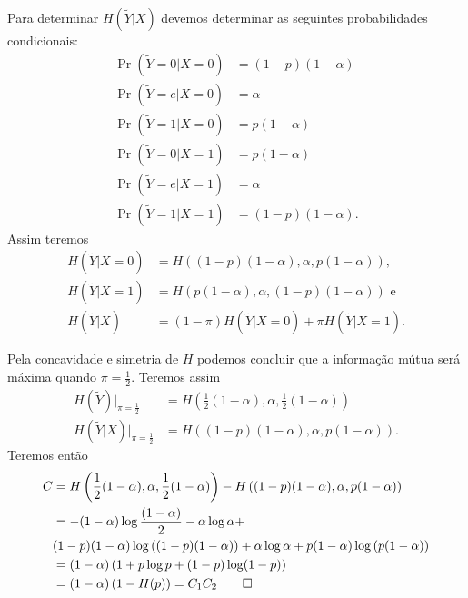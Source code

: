 \begin{questions}
\begin{solution}
Para determinar $H(\tilde{Y}|X)$ devemos determinar as seguintes probabilidades condicionais:
\begin{align}
\Pr(\tilde{Y} = 0 |X = 0) &= (1-p)(1-\alpha) \nonumber \\
\Pr(\tilde{Y} = e |X = 0) &= \alpha \nonumber \\
\Pr(\tilde{Y} = 1 |X = 0) &= p (1-\alpha) \nonumber \\
\Pr(\tilde{Y} = 0 |X = 1) &= p(1-\alpha) \nonumber \\
\Pr(\tilde{Y} = e |X = 1) &= \alpha \nonumber \\
\Pr(\tilde{Y} = 1 |X = 1) &= (1-p) (1-\alpha) .
\end{align}
Assim teremos
\begin{align}
H(\tilde{Y} |X = 0) &= H\left( (1-p)(1-\alpha), \alpha, p (1-\alpha) \right) , \nonumber \\
H(\tilde{Y} |X = 1) &= H\left( p(1-\alpha), \alpha, (1-p) (1-\alpha) \right) \text{ e} \nonumber \\
H(\tilde{Y} |X ) &= (1-\pi) H(\tilde{Y} |X = 0) + \pi H(\tilde{Y} |X = 1) .
\end{align}

Pela concavidade e simetria de $H$ podemos concluir que a informação mútua será máxima
quando $\pi = \frac{1}{2}$. Teremos assim
\begin{align}
H(\tilde{Y})\bigg\rvert_{\pi = \frac{1}{2}} &= H\left( \frac{1}{2} (1-\alpha), \alpha, \frac{1}{2} (1-\alpha) \right) \nonumber \\
H(\tilde{Y} |X )\bigg\rvert_{\pi = \frac{1}{2}} &= H\left( (1-p)(1-\alpha), \alpha, p(1-\alpha) \right) .
\end{align}
Teremos então
\begin{align}
C &= H\left( \frac{1}{2} (1-\alpha), \alpha, \frac{1}{2} (1-\alpha) \right) - H\left( (1-p)(1-\alpha), \alpha, p(1-\alpha) \right)  \nonumber \\
  &= - (1-\alpha) \log \frac{(1-\alpha)}{2} - \alpha \log \alpha + \nonumber \\
  & (1-p)(1-\alpha) \log \left( (1-p)(1-\alpha) \right) + \alpha \log \alpha + p(1-\alpha) \log \left( p(1-\alpha) \right) \nonumber \\
  &= (1-\alpha) \left( 1 + p\log p + (1-p) \log (1-p) \right) \nonumber \\
  &= (1-\alpha) \left( 1 - H(p) \right) = C_1 C_2 \qed
\end{align}

\end{solution}
\end{questions}
